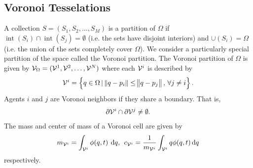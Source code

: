 \documentclass[10pt,conference]{IEEEtran}
\DeclareMathOperator{\interi}{int}
\begin{document}
	\subsection{Voronoi Tesselations}
		A collection $S = (S_1, S_2, \dots, S_M)$ is a partition of $\Omega$ if $\interi(S_i) \cap \interi(S_j) = \emptyset$ (i.e. the sets have disjoint interiors) and $\cup(S_i) = \Omega$ (i.e. the union of the sets completely cover $\Omega$). We consider a particularly special partition of the space called the Voronoi partition. The Voronoi partition of $\Omega$ is given by $\mathcal{V}_\Omega = (\mathcal{V}^1, \mathcal{V}^2, \dots, \mathcal{V}^N)$ where each $\mathcal{V}^i$ is described by 
		\begin{equation}
			\label{voronoi partition}
			\displaystyle \V^i = \left\{ q \in \Omega \, | \, \norm{q - p_i} \leq \norm{q - p_j}, \, \forall j \neq i \right\}.
		\end{equation}
		Agents $i$ and $j$ are Voronoi neighbors if they share a boundary. That is, 
		\begin{equation*}
			\displaystyle \partial \mathcal{V}^i \cap \partial \mathcal{V}^j \neq \emptyset.
		\end{equation*}
		The mass and center of mass of a Voronoi cell are given by 
		\begin{equation*}
			\displaystyle m_{\V^i} = \int_{\V^i}{\phi(q,t) \: \dif q}, \:\: c_{\V^i} = \frac{1}{m_{\V^i}}\int_{\V^i}{q\phi(q,t) \dif q}
		\end{equation*}
		respectively. 
\end{document}
